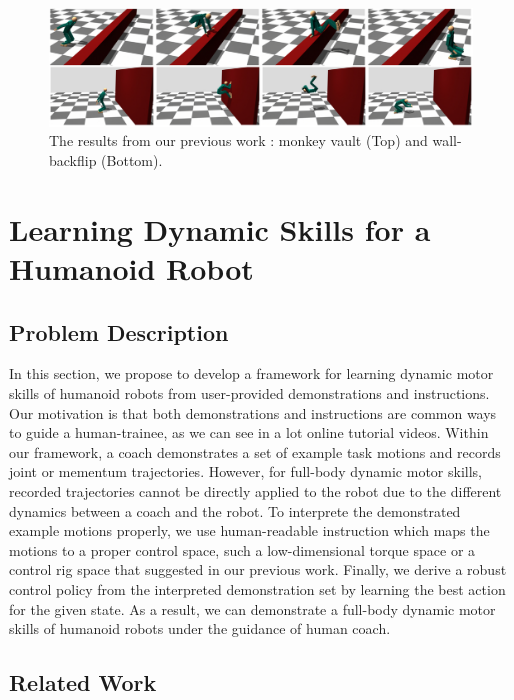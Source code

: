 \begin{figure}[htbp]
\center
  \includegraphics[width=\linewidth]{images/training1_teaser}
  \caption{The results from our previous work
    \cite{Ha:2014:ITD}:
    monkey vault (Top) and wall-backflip (Bottom).}
 \label{fig:training1_teaser}
\end{figure}


\section{Learning Dynamic Skills for a Humanoid Robot}

\subsection{Problem Description}

In this section, we propose to develop a framework for learning
dynamic motor skills of humanoid robots from user-provided demonstrations 
and instructions.
Our motivation is that both demonstrations and instructions are
common ways to guide a human-trainee, as we can see in a lot
online tutorial videos.
Within our framework, a coach demonstrates a set of example task motions
and records joint or mementum trajectories.
However, for full-body dynamic motor skills, recorded trajectories cannot 
be directly applied to the robot due to the different dynamics 
between a coach and the robot.
To interprete the demonstrated example motions properly,
we use human-readable instruction which maps the motions
to a proper control space, such a low-dimensional torque space 
or a control rig space \cite{Ha:2014:ITD} 
that suggested in our previous work.
Finally, we derive a robust control policy from the interpreted
demonstration set by learning the best action for the given state.
As a result, we can demonstrate a full-body dynamic motor skills
of humanoid robots under the guidance of human coach.

\subsection{Related Work}

